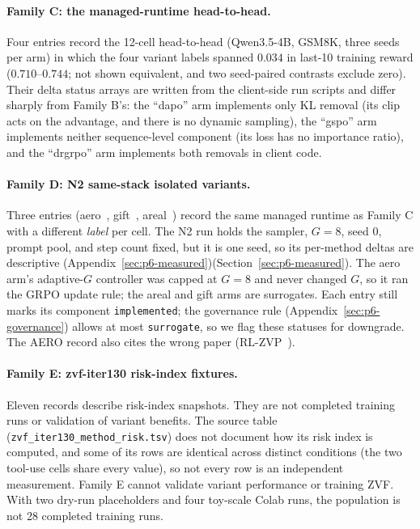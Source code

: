 \paragraph{Family C: the managed-runtime head-to-head.}
Four entries record the 12-cell head-to-head (Qwen3.5-4B, GSM8K, three seeds
per arm) in which the four variant labels spanned $0.034$ in last-10
training reward ($0.710$--$0.744$; not shown equivalent, and two seed-paired
contrasts exclude zero). Their delta status arrays are written from the
client-side run scripts and differ sharply from Family B's: the ``dapo'' arm
implements only KL removal (its clip acts on the advantage, and there is no
dynamic sampling), the ``gspo'' arm implements neither sequence-level
component (its loss has no importance ratio), and the ``drgrpo'' arm
implements both removals in client code.

\paragraph{Family D: N2 same-stack isolated variants.}
Three entries (aero~\citep{zhang2026aero}, gift~\citep{gift2025},
areal~\citep{areal2025}) record the same managed runtime as Family C with a
different \emph{label} per cell. The N2 run holds the sampler, $G{=}8$, seed 0,
prompt pool, and step count fixed, but it is one seed, so its per-method
deltas are descriptive
\ifdefined\SUBMISSIONBUILD(Appendix~\ref{sec:p6-measured})\else(Section~\ref{sec:p6-measured})\fi.
The aero arm's adaptive-$G$ controller was capped at $G{=}8$ and never changed
$G$, so it ran the GRPO update rule; the areal and gift arms are surrogates.
Each entry still marks its component \texttt{implemented}; the governance rule
(Appendix~\ref{sec:p6-governance}) allows at most \texttt{surrogate}, so we
flag these statuses for downgrade. The AERO record also cites the wrong
paper (RL-ZVP~\citep{le2025rlzvp}).

\paragraph{Family E: zvf-iter130 risk-index fixtures.}
Eleven records describe risk-index snapshots. They are not completed training
runs or validation of variant benefits. The source table
(\texttt{zvf\_iter130\_method\_risk.tsv}) does not document how its risk index
is computed, and some of its rows are identical across distinct conditions
(the two tool-use cells share every value), so not every row is an
independent measurement. Family E cannot validate variant performance or
training ZVF. With two dry-run placeholders and four toy-scale Colab runs,
the population is not 28 completed training runs.

